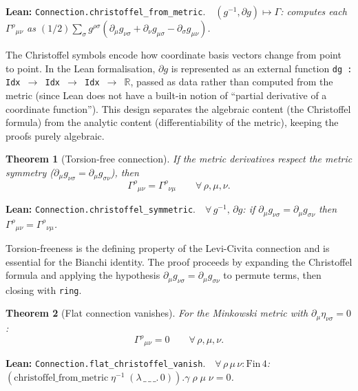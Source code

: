 \documentclass[11pt,a4paper]{article}
\newtheorem{theorem}{Theorem}[section]
\newcommand{\RR}{\mathbb{R}}
\newcommand{\lean}[1]{\texttt{#1}}
\newcommand{\leanref}[2]{\noindent\textbf{Lean:} \lean{#1}.\ \ \textit{#2}}
\begin{document}
\leanref{Connection.christoffel\_from\_metric}{$(g^{-1}, \partial g) \mapsto \Gamma$: computes each $\Gamma^\rho{}_{\mu\nu}$ as $(1/2)\sum_\sigma g^{\rho\sigma}(\partial_\mu g_{\nu\sigma} + \partial_\nu g_{\mu\sigma} - \partial_\sigma g_{\mu\nu})$.}

\noindent The Christoffel symbols encode how coordinate basis vectors change from point to point.
In the Lean formalisation, $\partial g$ is represented as an external function \lean{dg : Idx $\to$ Idx $\to$ Idx $\to$ $\RR$}, passed as data rather than computed from the metric (since Lean does not have a built-in notion of ``partial derivative of a coordinate function'').
This design separates the algebraic content (the Christoffel formula) from the analytic content (differentiability of the metric), keeping the proofs purely algebraic.

\begin{theorem}[Torsion-free connection]
\label{thm:torsion_free}
If the metric derivatives respect the metric symmetry ($\partial_\mu g_{\nu\sigma} = \partial_\mu g_{\sigma\nu}$), then
\begin{equation}\label{eq:torsion_free}
\Gamma^\rho{}_{\mu\nu} = \Gamma^\rho{}_{\nu\mu} \qquad \forall\,\rho,\mu,\nu.
\end{equation}
\end{theorem}

\leanref{Connection.christoffel\_symmetric}{$\forall\,g^{-1},\,\partial g$: if $\partial_\mu g_{\nu\sigma} = \partial_\mu g_{\sigma\nu}$ then $\Gamma^\rho{}_{\mu\nu} = \Gamma^\rho{}_{\nu\mu}$.}

\noindent Torsion-freeness is the defining property of the Levi-Civita connection and is essential for the Bianchi identity.
The proof proceeds by expanding the Christoffel formula and applying the hypothesis $\partial_\mu g_{\nu\sigma} = \partial_\mu g_{\sigma\nu}$ to permute terms, then closing with \texttt{ring}.

\begin{theorem}[Flat connection vanishes]
\label{thm:flat_gamma}
For the Minkowski metric with $\partial_\mu \eta_{\nu\sigma} = 0$:
\begin{equation}\label{eq:flat_gamma}
\Gamma^\rho{}_{\mu\nu} = 0 \qquad \forall\,\rho,\mu,\nu.
\end{equation}
\end{theorem}

\leanref{Connection.flat\_christoffel\_vanish}{$\forall\,\rho\,\mu\,\nu : \mathrm{Fin}\,4$: $(\mathrm{christoffel\_from\_metric}\;\eta^{-1}\;(\lambda\,\_ \,\_ \,\_.\, 0)).\gamma\;\rho\;\mu\;\nu = 0$.}
\end{document}
